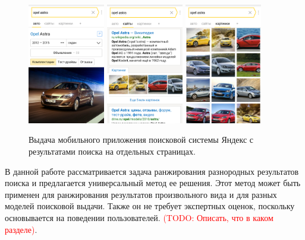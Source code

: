 \documentclass[12pt,a4paper]{report}
\newcommand\note[1]{\textcolor{red}{(#1)}}
\newcommand\todonote[1]{\note{TODO: #1}}
\begin{document}
\begin{figure}[b!]
  \centering
  \includegraphics[width=0.3\textwidth]{pics/MultiPageSerp-Yandex-1.png}
  \includegraphics[width=0.3\textwidth]{pics/MultiPageSerp-Yandex-2.png}
  \includegraphics[width=0.3\textwidth]{pics/MultiPageSerp-Yandex-3.png}
  \caption{Выдача мобильного приложения поисковой системы Яндекс с результатами поиска на отдельных страницах.}
  \label{yandex-mobile-app-serp}
\end{figure}

В данной работе рассматривается задача ранжирования разнородных результатов поиска и предлагается универсальный метод ее решения. Этот метод может быть применен для ранжирования результатов произвольного вида и для разных моделей поисковой выдачи. Также он не требует экспертных оценок, поскольку основывается на поведении пользователей.   \todonote{Описать, что в каком разделе}. 
\end{document}

